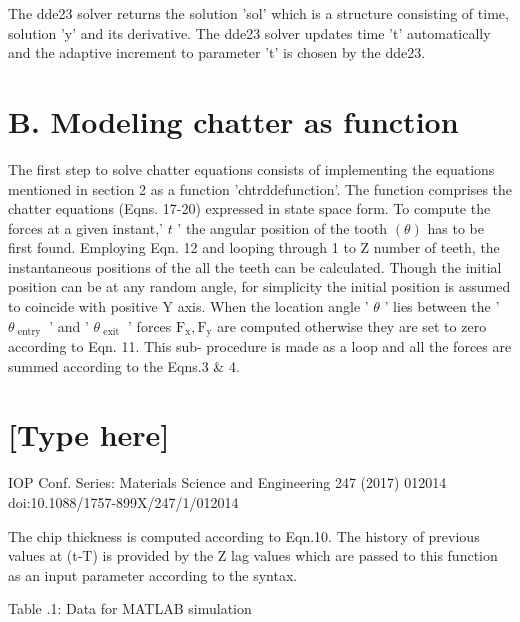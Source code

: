 \documentclass[10pt]{article}
\begin{document}
The dde23 solver returns the solution 'sol' which is a structure consisting of time, solution 'y' and its derivative. The dde23 solver updates time ’t’ automatically and the adaptive increment to parameter ’t’ is chosen by the dde23.

\section*{B. Modeling chatter as function}

The first step to solve chatter equations consists of implementing the equations mentioned in section 2 as a function 'chtrddefunction'. The function comprises the chatter equations (Eqns. 17-20) expressed in state space form. To compute the forces at a given instant,’ \(t\) ’ the angular position of the tooth \(\left( \theta \right)\) has to be first found. Employing Eqn. 12 and looping through 1 to Z number of teeth, the instantaneous positions of the all the teeth can be calculated. Though the initial position can be at any random angle, for simplicity the initial position is assumed to coincide with positive \(\mathrm{Y}\) axis. When the location angle ’ \(\theta\) ’ lies between the ’ \({\theta }_{\text{ entry }}\) ’ and ’ \({\theta }_{\text{ exit }}\) ’ forces \({\mathrm{F}}_{\mathrm{x}},{\mathrm{F}}_{\mathrm{y}}\) are computed otherwise they are set to zero according to Eqn. 11. This sub- procedure is made as a loop and all the forces are summed according to the Eqns.3 \& 4.

\section*{[Type here]}

IOP Conf. Series: Materials Science and Engineering 247 (2017) 012014 doi:10.1088/1757-899X/247/1/012014

The chip thickness is computed according to Eqn.10. The history of previous values at (t-T) is provided by the \(\mathrm{Z}\) lag values which are passed to this function as an input parameter according to the syntax.

Table .1: Data for MATLAB simulation

\begin{center}
\end{center}
\end{document}

